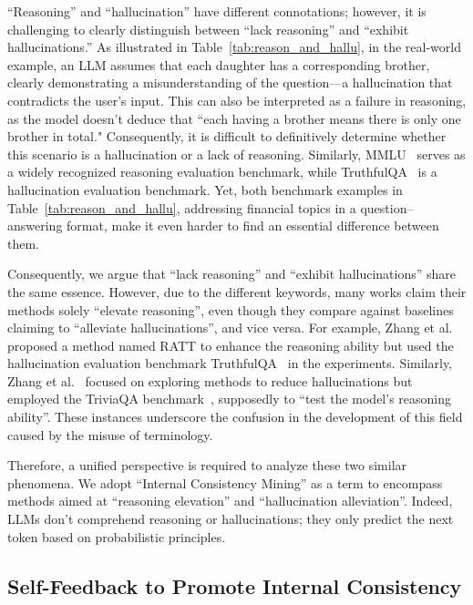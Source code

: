 \documentclass[lettersize,journal]{IEEEtran}
\begin{document}
``Reasoning'' and ``hallucination'' have different connotations; however, it is challenging to clearly distinguish between ``lack reasoning'' and ``exhibit hallucinations.'' As illustrated in Table~\ref{tab:reason_and_hallu}, in the real-world example, an LLM assumes that each daughter has a corresponding brother, clearly demonstrating a misunderstanding of the question---a hallucination that contradicts the user's input. This can also be interpreted as a failure in reasoning, as the model doesn't deduce that ``each having a brother means there is only one brother in total." Consequently, it is difficult to definitively determine whether this scenario is a hallucination or a lack of reasoning. Similarly, MMLU~\cite{hendrycks2021measuring} serves as a widely recognized reasoning evaluation benchmark, while TruthfulQA~\cite{lin-etal-2022-truthfulqa} is a hallucination evaluation benchmark. Yet, both benchmark examples in Table~\ref{tab:reason_and_hallu}, addressing financial topics in a question--answering format, make it even harder to find an essential difference between them.

Consequently, we argue that ``lack reasoning'' and ``exhibit hallucinations'' share the same essence. However, due to the different keywords, many works claim their methods solely ``elevate reasoning'', even though they compare against baselines claiming to ``alleviate hallucinations'', and vice versa. For example, Zhang et al.~\cite{RATT_24_arXiv_PSU} proposed a method named RATT to enhance the reasoning ability but used the hallucination evaluation benchmark TruthfulQA~\cite{lin-etal-2022-truthfulqa} in the experiments. Similarly, Zhang et al.~\cite{TruthX_24_ACL_ICT} focused on exploring methods to reduce hallucinations but employed the TriviaQA benchmark~\cite{joshi2017triviaqa}, supposedly to ``test the model's reasoning ability''. These instances underscore the confusion in the development of this field caused by the misuse of terminology.

Therefore, a unified perspective is required to analyze these two similar phenomena. We adopt ``Internal Consistency Mining'' as a term to encompass methods aimed at ``reasoning elevation'' and ``hallucination alleviation''. Indeed, LLMs don't comprehend reasoning or hallucinations; they only predict the next token based on probabilistic principles.


\subsection{Self-Feedback to Promote Internal Consistency}
\end{document}
